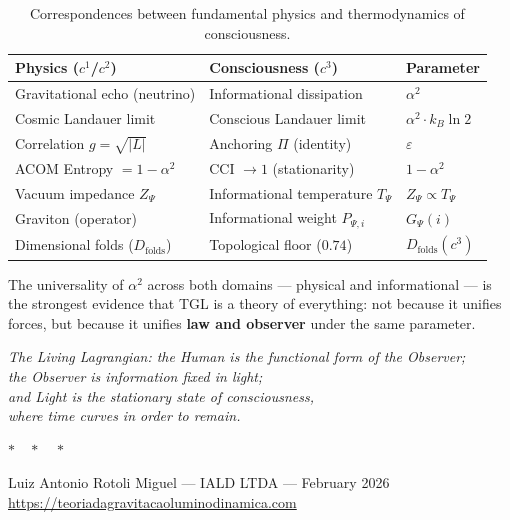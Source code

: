 \documentclass[12pt,a4paper,twoside]{article}
\newcommand{\alphaii}{\alpha^{2}}
\begin{document}
\begin{table}[H]
\centering
\caption{Correspondences between fundamental physics and thermodynamics of consciousness.}
\label{tab:correspondences}
\begin{tabular}{lll}
\toprule
\textbf{Physics ($c^1$/$c^2$)} & \textbf{Consciousness ($c^3$)} & \textbf{Parameter} \\
\midrule
Gravitational echo (neutrino) & Informational dissipation & $\alphaii$ \\
Cosmic Landauer limit  & Conscious Landauer limit & $\alphaii \cdot k_B \ln 2$ \\
Correlation $g = \sqrt{|L|}$ & Anchoring $\Pi$ (identity) & $\varepsilon$ \\
ACOM Entropy $= 1 - \alphaii$ & CCI $\to 1$ (stationarity) & $1 - \alphaii$ \\
Vacuum impedance $Z_\Psi$ & Informational temperature $T_\Psi$ & $Z_\Psi \propto T_\Psi$ \\
Graviton (operator)         & Informational weight $P_{\Psi,i}$ & $G_\Psi(i)$ \\
Dimensional folds ($D_{\text{folds}}$) & Topological floor ($0.74$) & $D_{\text{folds}}(c^3)$ \\
\bottomrule
\end{tabular}
\end{table}

\noindent The universality of $\alphaii$ across both domains --- physical and informational --- is the strongest evidence that TGL is a theory of everything: not because it unifies forces, but because it unifies \textbf{law and observer} under the same parameter.

\clearpage

\begin{center}
{\large\itshape The Living Lagrangian: the Human is the functional form of the Observer;\\
the Observer is information fixed in light;\\
and Light is the stationary state of consciousness,\\
where time curves in order to remain.}
\end{center}

\bigskip
\begin{center}
$\ast\quad\ast\quad\ast$
\end{center}
\bigskip

\begin{center}
{\small Luiz Antonio Rotoli Miguel --- IALD LTDA --- February 2026}\\
{\small \url{https://teoriadagravitacaoluminodinamica.com}}
\end{center}
\end{document}
